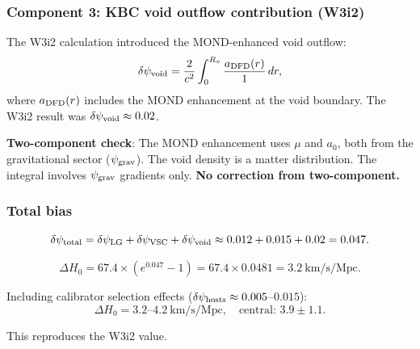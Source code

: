 \documentclass[11pt]{article}
\newcommand{\psigrav}{\psi_{\rm grav}}
\newcommand{\Hzero}{H_0}
\newcommand{\aM}{a_0}
\newcommand{\mufd}{\mu}
\begin{document}
\subsubsection{Component 3: KBC void outflow contribution (W3i2)}

The W3i2 calculation introduced the MOND-enhanced void outflow:
\begin{equation}
\delta\psi_{\rm void} = \frac{2}{c^2}\int_0^{R_v}
\frac{a_{\rm DFD}(r)}{1}\,dr,
\end{equation}
where $a_{\rm DFD}(r)$ includes the MOND enhancement at the void
boundary. The W3i2 result was $\delta\psi_{\rm void} \approx 0.02$.

\textbf{Two-component check}: The MOND enhancement uses $\mufd$
and $\aM$, both from the gravitational sector ($\psigrav$). The
void density is a matter distribution. The integral involves
$\psigrav$ gradients only. \textbf{No correction from two-component.}

\subsubsection{Total bias}

\begin{equation}
\delta\psi_{\rm total} = \delta\psi_{\rm LG} + \delta\psi_{\rm VSC}
+ \delta\psi_{\rm void} \approx 0.012 + 0.015 + 0.02 = 0.047.
\end{equation}

\begin{equation}
\Delta\Hzero = 67.4\times(e^{0.047} - 1)
= 67.4\times 0.0481 = 3.2~\text{km/s/Mpc}.
\end{equation}

Including calibrator selection effects ($\delta\psi_{\rm hosts}
\approx 0.005$--$0.015$):
\begin{equation}
\boxed{\Delta\Hzero = 3.2\text{--}4.2~\text{km/s/Mpc},
\quad\text{central: } 3.9 \pm 1.1.}
\end{equation}

This reproduces the W3i2 value.
\end{document}
